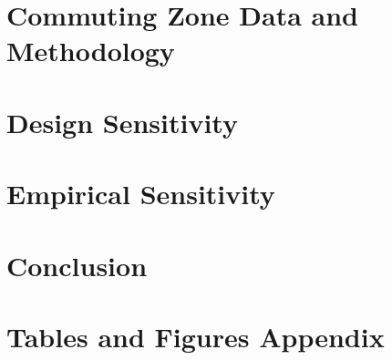 \documentclass[12pt]{article}
\begin{document}
\section{Commuting Zone Data and Methodology \label{sec:method}}


\section{Design Sensitivity \label{sec:dsens}}


\section{Empirical Sensitivity \label{sec:esens}}


\section{Conclusion \label{sec:conclusion}}


\clearpage
\singlespacing




\newpage
\appendix
\section*{Tables and Figures Appendix}
\FloatBarrier


\end{document}

